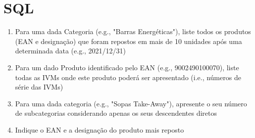 \documentclass[12pt,a4paper]{article}
\begin{document}
  \section*{SQL}
  
  \begin{enumerate}
    \item Para uma dada Categoria (e.g., "Barras Energéticas"), liste todos os produtos (EAN e designação) que foram repostos em mais de 10 unidades após uma determinada data (e.g., 2021/12/31)
    
    

    \item Para um dado Produto identificado pelo EAN (e.g., 9002490100070), liste todas as IVMs onde este produto poderá ser apresentado (i.e., números de série das IVMs)

    

    \item Para uma dada categoria (e.g., "Sopas Take-Away"), apresente o seu número de subcategorias considerando apenas os seus descendentes diretos

    

    \item Indique o EAN e a designação do produto mais reposto

    
  \end{enumerate}
\end{document}

